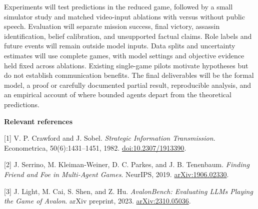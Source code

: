 \documentclass[11pt,letterpaper]{article}
\begin{document}
Experiments will test predictions in the reduced game, followed by a small simulator study and matched video-input ablations with versus without public speech. Evaluation will separate mission success, final victory, assassin identification, belief calibration, and unsupported factual claims. Role labels and future events will remain outside model inputs. Data splits and uncertainty estimates will use complete games, with model settings and objective evidence held fixed across ablations. Existing single-game pilots motivate hypotheses but do not establish communication benefits. The final deliverables will be the formal model, a proof or carefully documented partial result, reproducible analysis, and an empirical account of where bounded agents depart from the theoretical predictions.

\vspace{2pt}
\textbf{Relevant references}\par
\begingroup
\small
\setlength{\parskip}{3pt}
[1] V. P. Crawford and J. Sobel. \emph{Strategic Information Transmission}. Econometrica, 50(6):1431--1451, 1982. \href{https://doi.org/10.2307/1913390}{doi:10.2307/1913390}.

[2] J. Serrino, M. Kleiman-Weiner, D. C. Parkes, and J. B. Tenenbaum. \emph{Finding Friend and Foe in Multi-Agent Games}. NeurIPS, 2019. \href{https://arxiv.org/abs/1906.02330}{arXiv:1906.02330}.

[3] J. Light, M. Cai, S. Shen, and Z. Hu. \emph{AvalonBench: Evaluating LLMs Playing the Game of Avalon}. arXiv preprint, 2023. \href{https://arxiv.org/abs/2310.05036}{arXiv:2310.05036}.
\endgroup
\end{document}
